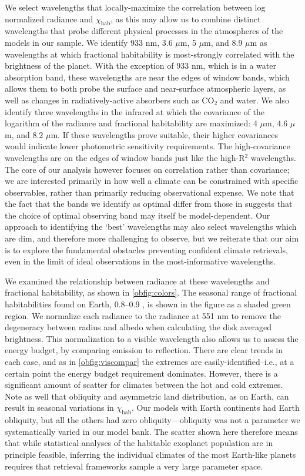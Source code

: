 \documentclass[fleqn,usenatbib]{mnras}
\begin{document}
We select wavelengths that locally-maximize the correlation between log normalized radiance and $\chi_\text{hab}$, as this may allow us to combine distinct wavelengths that probe different physical processes in the atmospheres of the models in our sample. We identify 933 nm, 3.6 $\mu$m, 5 $\mu$m, and 8.9 $\mu$m as wavelengths at which fractional habitability is most-strongly correlated with the brightness of the planet. With the exception of 933 nm, which is in a water absorption band, these wavelengths are near the edges of window bands, which allows them to both probe the surface and near-surface atmospheric layers, as well as changes in radiatively-active absorbers such as CO$_2$ and water. We also identify three wavelengths in the infrared at which the covariance of the logarithm of the radiance and fractional habitability are maximized: 4 $\mu$m, 4.6 $\mu$m, and 8.2 $\mu$m. If these wavelengths prove suitable, their higher covariances would indicate lower photometric sensitivity requirements. The high-covariance wavelengths are on the edges of window bands just like the high-R$^2$ wavelengths. The core of our analysis however focuses on correlation rather than covariance; we are interested primarily in how well a climate can be constrained with specific observables, rather than primarily reducing observational expense. We note that the fact that the bands we identify as optimal differ from those in \citet{Krissansen-Totton2016} suggests that the choice of optimal observing band may itself be model-dependent. Our approach to identifying the `best' wavelengths may also select wavelengths which are dim, and therefore more challenging to observe, but we reiterate that our aim is to explore the fundamental obstacles preventing confident climate retrievals, even in the limit of ideal observations in the most-informative wavelengths.

We examined the relationship between radiance at these wavelengths and fractional habitability, as shown in \autoref{obfig:colors}. The seasonal range of fractional habitabilities found on Earth, 0.8--0.9 \citep{Spiegel2008}, is shown in the figure as a shaded green region. We normalize each radiance to the radiance at 551 nm to remove the degeneracy between radius and albedo when calculating the disk averaged brightness. This normalization to a visible wavelength also allows us to assess the energy budget, by comparing emission to reflection. There are clear trends in each case, and as in \autoref{obfig:viscompar} the extremes are easily-identified--i.e., at a certain point the energy budget requirement dominates. However, there is a significant amount of scatter for climates between the hot and cold extremes. Note as well that obliquity and asymmetric land distribution, as on Earth, can result in seasonal variations in $\chi_\text{hab}$. Our models with Earth continents had Earth obliquity, but all the others had zero obliquity---obliquity was not a parameter we systematically varied in our model bank. The scatter shown here therefore means that while statistical analyses of the habitable exoplanet population are in principle feasible, inferring the individual climates of the most Earth-like planets requires that retrieval frameworks sample a very large parameter space.
\end{document}

